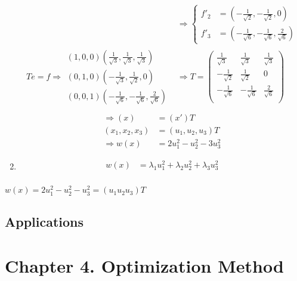 \begin{enumerate}
\begin{align*}
        &\Rightarrow \begin{cases}
            f'_2 &= \left( -\frac{1}{\sqrt{2}}, -\frac{1}{\sqrt{2}}, 0 \right)\\
            f'_3 &= \left( -\frac{1}{\sqrt{6}}, -\frac{1}{\sqrt{6}}, \frac{2}{\sqrt{6}} \right)
        \end{cases}\\
        Te=f \Rightarrow \begin{matrix}
            (1,0,0) \left(\frac{1}{\sqrt{3}},\frac{1}{\sqrt{3}},\frac{1}{\sqrt{3}}\right)\\
            (0,1,0) \left( -\frac{1}{\sqrt{3}}, \frac{1}{\sqrt{2}}, 0 \right)\\
            (0,0,1) \left( -\frac{1}{\sqrt{6}}, -\frac{1}{\sqrt{6}}, \frac{2}{\sqrt{6}} \right) 
        \end{matrix}&\Rightarrow T = \begin{pmatrix}
            \frac{1}{\sqrt{3}} & \frac{1}{\sqrt{3}} & \frac{1}{\sqrt{3}}\\
            -\frac{1}{\sqrt{2}} & \frac{1}{\sqrt{2}} & 0\\
            -\frac{1}{\sqrt{6}} & -\frac{1}{\sqrt{6}} & \frac{2}{\sqrt{6}}\\
        \end{pmatrix}\\
    \end{align*}
    \begin{align*}
        \Rightarrow (x) &= (x')T\\
        (x_1, x_2, x_3) &= (u_1, u_2, u_3)T\\
        \Rightarrow w(x) &= 2u_1^2 - u_2^2 - 3u_3^2
    \end{align*}
    \item \begin{align*}
        w(x) &= \lambda_1u_1^2 + \lambda_2u_2^2 + \lambda_3u_3^2\\
    \end{align*}
\end{enumerate}
$w(x) = 2u_1^2 - u_2^2 - u_3^2 = (u_1u_2u_3)T$




\subsection{Applications}

\newpage
\section{Chapter 4. Optimization Method}
